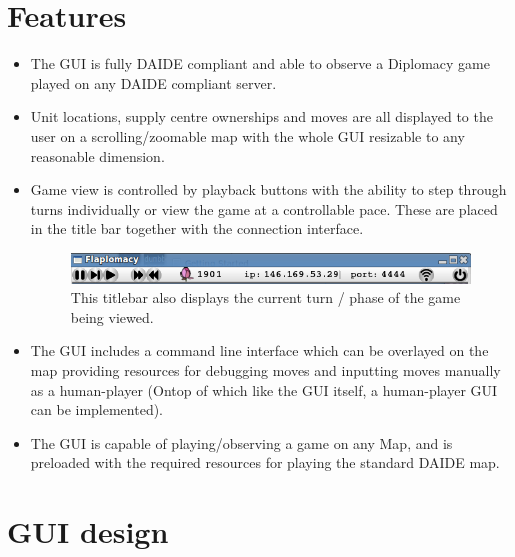 \section{Features}

\begin{itemize}

\item The GUI is fully DAIDE compliant and able to observe a Diplomacy game
      played on any DAIDE compliant server.

\item Unit locations, supply centre ownerships and moves are all displayed
      to the user on a scrolling/zoomable map with the whole GUI
      resizable to any reasonable dimension.

\item Game view is controlled by playback buttons with the ability to step
      through turns individually or view the game at a controllable
      pace. These are placed in the title bar together with the connection
      interface. \\[0.5cm]

\begin{figure}

\includegraphics[scale=0.5]{./screenshots/Titlebar.png} \\[0.5cm]

This titlebar also displays the current turn / phase of the game being
viewed.

\end{figure}

\item The GUI includes a command line interface which can be overlayed on
      the map providing resources for debugging moves and inputting
      moves manually as a human-player (Ontop of which like the GUI
      itself, a human-player GUI can be implemented).

\item The GUI is capable of playing/observing a game on any Map, and is
      preloaded with the required resources for playing the standard
      DAIDE map.

\end{itemize}


\section{GUI design}

